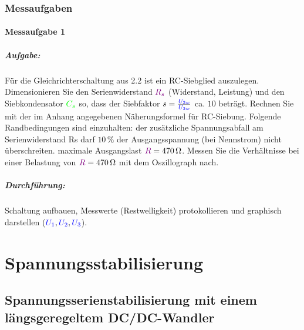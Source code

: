 \documentclass[11pt,a4paper,titlepage]{scrreprt}
\begin{document}
            \subsection{Messaufgaben}
            \subsubsection{Messaufgabe 1}
            \paragraph{Aufgabe:}  Für die Gleichrichterschaltung aus 2.2 ist ein RC-Siebglied auszulegen. Dimensionieren Sie den Serienwiderstand $\textcolor{violet}{R_s}$ (Widerstand, Leistung) und den Siebkondensator $\textcolor{green}{C_s}$ so, dass der Siebfaktor $s = \frac{\textcolor{blue}{U_{2w}}}{\textcolor{blue}{U_{3w}}}$ ca. $10$ beträgt. Rechnen Sie mit der im Anhang angegebenen Näherungsformel für RC-Siebung. Folgende Randbedingungen sind einzuhalten: der zusätzliche Spannungsabfall am Serienwiderstand Rs darf $10\,\%$ der Ausgangsspannung (bei Nennstrom) nicht überschreiten. maximale Ausgangslast $\textcolor{violet}{R} = \SI{470}{\ohm}$. Messen Sie die Verhältnisse bei einer Belastung von $\textcolor{violet}{R} = \SI{470}{\ohm}$ mit dem Oszillograph nach.
            \paragraph{Durchführung: } Schaltung aufbauen, Messwerte (Restwelligkeit) protokollieren und graphisch darstellen ($\textcolor{blue}{U_1}, \textcolor{blue}{U_2}, \textcolor{blue}{U_3} $).
            
        
    \chapter{Spannungsstabilisierung}
        \section{Spannungsserienstabilisierung mit einem längsgeregeltem DC/DC-Wandler}
\end{document}
